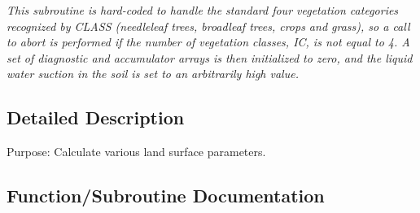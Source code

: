 \begin{DoxyCompactItemize}
\begin{DoxyCompactList}\small\item\em This subroutine is hard-\/coded to handle the standard four vegetation categories recognized by C\+L\+A\+S\+S (needleleaf trees, broadleaf trees, crops and grass), so a call to abort is performed if the number of vegetation classes, I\+C, is not equal to 4. A set of diagnostic and accumulator arrays is then initialized to zero, and the liquid water suction in the soil is set to an arbitrarily high value. \end{DoxyCompactList}\end{DoxyCompactItemize}


\subsection{Detailed Description}
Purpose\+: Calculate various land surface parameters. 



\subsection{Function/\+Subroutine Documentation}
\hypertarget{APREP_8f_a5fe4fa336815bc509d646edae0744405}{}
